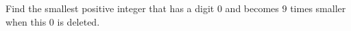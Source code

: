 Find the smallest positive integer that has a digit $0$ and becomes $9$ times smaller when this $0$ is deleted.
